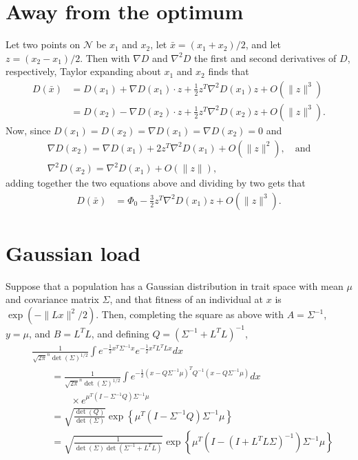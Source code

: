 \documentclass{article}
\newcommand{\grad}{\nabla}
\newcommand{\1}{\mathbbm{1}}
\newcommand{\allS}{\mathcal{N}}
\newcommand{\optph}{\Phi_0}
\begin{document}
\section{Away from the optimum}
\label{apx:away_from_opt}

Let two points on $\allS$ be $x_1$ and $x_2$, let $\bar x = (x_1+x_2)/2$, and let $z=(x_2 - x_1)/2$.
Then with $\grad D$ and $\grad^2 D$ the first and second derivatives of $D$, respectively,
Taylor expanding about $x_1$ and $x_2$ finds that
\begin{align*}
    D(\bar x) 
    &= D(x_1) + \grad D(x_1) \cdot z + \frac{1}{2} z^T \grad^2  D(x_1) z + O(\|z\|^3) \\
    &=  D(x_2) - \grad D(x_2) \cdot z + \frac{1}{2} z^T \grad^2  D(x_2) z + O(\|z\|^3) .
\end{align*}
Now, since $ D(x_1) =  D(x_2) = \grad D(x_1) = \grad D(x_2) = 0$ and
\begin{align*}
    \grad D(x_2) = \grad D(x_1) + 2 z^T \grad^2  D(x_1) + O(\|z\|^2), \quad \text{and} \\
    \grad^2 D(x_2) = \grad^2 D(x_1) + O(\|z\|), 
\end{align*}
adding together the two equations above and dividing by two gets that
\begin{align*}
     D(\bar x) 
    &= \optph - \frac{3}{2} z^T \grad^2  D(x_1) z + O(\|z\|^3) .
\end{align*}


\section{Gaussian load}
\label{apx:gauss_load}

Suppose that a population has a Gaussian distribution in trait space
with mean $\mu$ and covariance matrix $\Sigma$,
and that fitness of an individual at $x$ is $\exp(-\|Lx\|^2/2)$.
Then, completing the square as above with $A=\Sigma^{-1}$, $y=\mu$, and $B=L^T L$,
and defining $Q = (\Sigma^{-1} + L^T L)^{-1}$,
\begin{align*}
    &
    \frac{1}{\sqrt{2 \pi}^n \det(\Sigma)^{1/2}} 
        \int e^{-\frac{1}{2} x^T \Sigma^{-1} x} e^{-\frac{1}{2} x^T L^T L x} dx \\
    &\qquad =
    \frac{1}{\sqrt{2 \pi}^n \det(\Sigma)^{1/2}} 
        \int e^{-\frac{1}{2}(x-Q \Sigma^{-1} \mu)^T Q^{-1} (x-Q \Sigma^{-1} \mu)} dx 
        \\ &\qquad \qquad {}
        \times e^{\mu^T \left( I - \Sigma^{-1} Q \right) \Sigma^{-1} \mu} \\
    &\qquad =
    \sqrt{\frac{\det(Q)}{\det(\Sigma)}}
        \exp\left\{\mu^T \left( I - \Sigma^{-1} Q \right) \Sigma^{-1} \mu\right\} \\
    &\qquad =
    \sqrt{\frac{1}{\det(\Sigma)\det(\Sigma^{-1}+L^TL)}}
        \exp\left\{\mu^T \left( I - (I + L^T L \Sigma)^{-1} \right) \Sigma^{-1} \mu\right\} \\
\end{align*}
\end{document}

